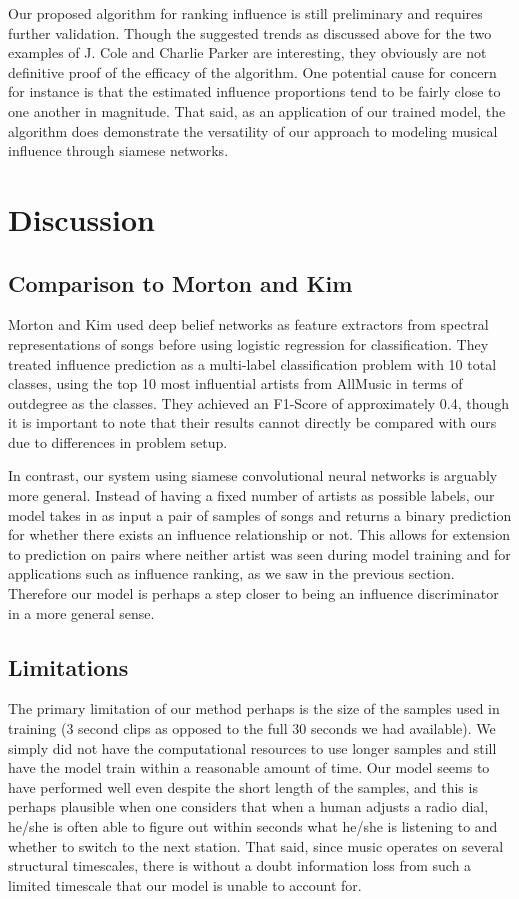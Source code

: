 Our proposed algorithm for ranking influence is still preliminary and requires further validation. Though the suggested trends as discussed above for the two examples of J. Cole and Charlie Parker are interesting, they obviously are not definitive proof of the efficacy of the algorithm. One potential cause for concern for instance is that the estimated influence proportions tend to be fairly close to one another in magnitude. That said, as an application of our trained model, the algorithm does demonstrate the versatility of our approach to modeling musical influence through siamese networks.

\section{Discussion}
\subsection{Comparison to Morton and Kim}
Morton and Kim \cite{morton2015acoustic} used deep belief networks \cite{hinton2006fast} as feature extractors from spectral representations of songs before using logistic regression for classification. They treated influence prediction as a multi-label classification problem with 10 total classes, using the top 10 most influential artists from AllMusic in terms of outdegree as the classes. They achieved an F1-Score of approximately 0.4, though it is important to note that their results cannot directly be compared with ours due to differences in problem setup.

In contrast, our system using siamese convolutional neural networks is arguably more general. Instead of having a fixed number of artists as possible labels, our model takes in as input a pair of samples of songs and returns a binary prediction for whether there exists an influence relationship or not. This allows for extension to prediction on pairs where neither artist was seen during model training and for applications such as influence ranking, as we saw in the previous section. Therefore our model is perhaps a step closer to being an influence discriminator in a more general sense.

\subsection{Limitations}
The primary limitation of our method perhaps is the size of the samples used in training (3 second clips as opposed to the full 30 seconds we had available). We simply did not have the computational resources to use longer samples and still have the model train within a reasonable amount of time. Our model seems to have performed well even despite the short length of the samples, and this is perhaps plausible when one considers that when a human adjusts a radio dial, he/she is often able to figure out within seconds what he/she is listening to and whether to switch to the next station. That said, since music operates on several structural timescales, there is without a doubt information loss from such a limited timescale that our model is unable to account for.

